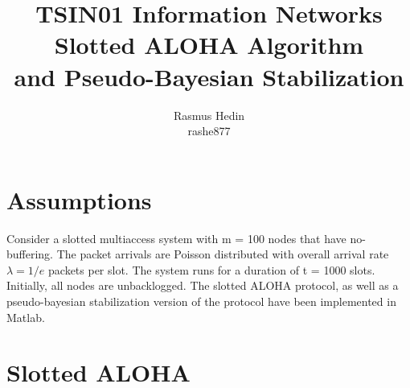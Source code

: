 \documentclass{article}
\begin{document}
\title{%
  TSIN01 Information Networks \\
  \large Slotted ALOHA Algorithm \\
  and Pseudo-Bayesian Stabilization}
\author{Rasmus Hedin \\
rashe877}

\maketitle

\section{Assumptions}
Consider a slotted multiaccess system with m = 100 nodes that have no-buffering. The packet arrivals are Poisson distributed with overall arrival rate $\lambda = 1/e$ packets per slot. The system runs for a duration of t = 1000 slots. Initially, all nodes are unbacklogged. The slotted ALOHA protocol, as well as a pseudo-bayesian stabilization version of the protocol have been implemented in Matlab.

\section{Slotted ALOHA}
\end{document}
